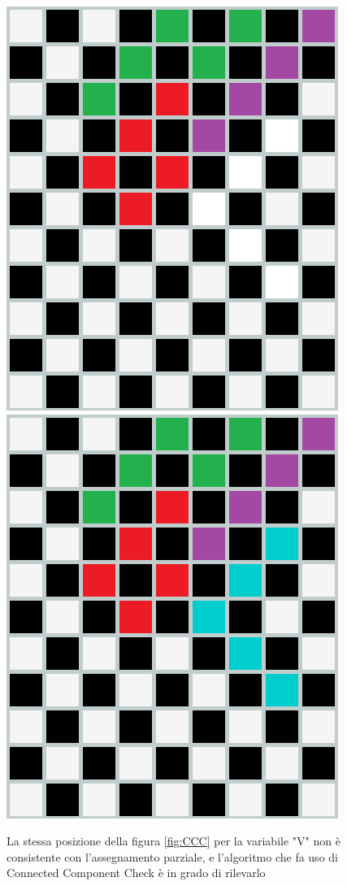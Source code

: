\begin{figure}[h]
	\centering
	{\includegraphics[scale=0.35]{immagini/esCC}}
	\hspace{5mm}
	{\includegraphics[scale=0.35]{immagini/esCC_no}}
	\caption{La stessa posizione della figura \ref{fig:CCC} per la variabile "V" non è consistente con l'assegnamento parziale, e l'algoritmo che fa uso di Connected Component Check è in grado di rilevarlo}
	\label{fig:badCCC}
\end{figure}

